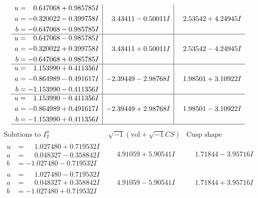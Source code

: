 \documentclass[1p]{elsarticle_modified}
\theoremstyle{definition}
\newcommand{\I}{\sqrt{-1}}
\begin{document}
$$\begin{array}{c|c|c}
\begin{aligned}
u &= \phantom{-}0.647068 + 0.985785 I \\
a &= -0.320022 - 0.399758 I \\
b &= -0.647068 - 0.985785 I\end{aligned}
 & \phantom{-}3.43411 - 0.50011 I & \phantom{-}2.53542 + 4.24945 I \\ \hline\begin{aligned}
u &= \phantom{-}0.647068 - 0.985785 I \\
a &= -0.320022 + 0.399758 I \\
b &= -0.647068 + 0.985785 I\end{aligned}
 & \phantom{-}3.43411 + 0.50011 I & \phantom{-}2.53542 - 4.24945 I \\ \hline\begin{aligned}
u &= \phantom{-}1.153990 + 0.411356 I \\
a &= -0.864989 - 0.491617 I \\
b &= -1.153990 - 0.411356 I\end{aligned}
 & -2.39449 - 2.98768 I & \phantom{-}1.98501 + 3.10922 I \\ \hline\begin{aligned}
u &= \phantom{-}1.153990 - 0.411356 I \\
a &= -0.864989 + 0.491617 I \\
b &= -1.153990 + 0.411356 I\end{aligned}
 & -2.39449 + 2.98768 I & \phantom{-}1.98501 - 3.10922 I\\
 \hline 
 \end{array}$$\newpage$$\begin{array}{c|c|c}  
\text{Solutions to }I^u_{2}& \I (\text{vol} + \sqrt{-1}CS) & \text{Cusp shape}\\
 \hline 
\begin{aligned}
u &= \phantom{-}1.027480 + 0.719532 I \\
a &= \phantom{-}0.048327 - 0.358842 I \\
b &= -1.027480 - 0.719532 I\end{aligned}
 & \phantom{-}4.91059 + 5.90541 I & \phantom{-}1.71844 - 3.95716 I \\ \hline\begin{aligned}
u &= \phantom{-}1.027480 - 0.719532 I \\
a &= \phantom{-}0.048327 + 0.358842 I \\
b &= -1.027480 + 0.719532 I\end{aligned}
 & \phantom{-}4.91059 - 5.90541 I & \phantom{-}1.71844 + 3.95716 I \\ \hline\begin{aligned}

\end{aligned}
\end{array}$$
\end{document}
